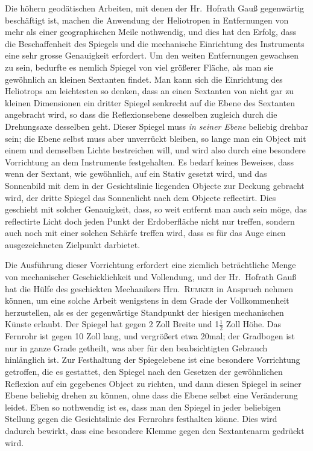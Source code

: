 \documentclass[12pt,a4paper]{article}
\theoremstyle{plain}
\theoremstyle{definition}
\theoremstyle{remark}
\begin{document}
Die h\"ohern geod\"atischen Arbeiten, mit denen der Hr.\ Hofrath Gau\ss{} gegenw\"artig besch\"aftigt ist, machen die Anwendung der Heliotropen in Entfernungen von mehr als einer geographischen Meile nothwendig, und dies hat den Erfolg, dass die Beschaffenheit des Spiegels und die mechanische Einrichtung des Instruments eine sehr grosse Genauigkeit erfordert. Um den weiten Entfernungen gewachsen zu sein, bedurfte es nemlich Spiegel von viel gr\"o\ss erer Fl\"ache, als man sie gew\"ohnlich an kleinen Sextanten findet. Man kann sich die Einrichtung des Heliotrops am leichtesten so denken, dass an einen Sextanten von nicht gar zu kleinen Dimensionen ein dritter Spiegel senkrecht auf die Ebene des Sextanten angebracht wird, so dass die Reflexionsebene desselben zugleich durch die Drehungsaxe desselben geht. Dieser Spiegel muss \textit{in seiner Ebene} beliebig drehbar sein; die Ebene selbst muss aber unverr\"uckt bleiben, so lange man ein Object mit einem und demselben Lichte bestreichen will, und wird also durch eine besondere Vorrichtung an dem Instrumente festgehalten. Es bedarf keines Beweises, dass wenn der Sextant, wie gew\"ohnlich, auf ein Stativ gesetzt wird, und das Sonnenbild mit dem in der Gesichtslinie liegenden Objecte zur Deckung gebracht wird, der dritte Spiegel das Sonnenlicht nach dem Objecte reflectirt. Dies geschieht mit solcher Genauigkeit, dass, so weit entfernt man auch sein m\"oge, das reflectirte Licht doch jeden Punkt der Erdoberfl\"ache nicht nur treffen, sondern auch noch mit einer solchen Sch\"arfe treffen wird, dass es f\"ur das Auge einen ausgezeichneten Zielpunkt darbietet.

Die Ausf\"uhrung dieser Vorrichtung erfordert eine ziemlich betr\"achtliche Menge von mechanischer Geschicklichkeit und Vollendung, und der Hr.\ Hofrath Gau\ss{} hat die H\"ulfe des geschickten Mechanikers Hrn.\ \textsc{Rumker} in Anspruch nehmen k\"onnen, um eine solche Arbeit wenigstens in dem Grade der Vollkommenheit herzustellen, als es der gegenw\"artige Standpunkt der hiesigen mechanischen K\"unste erlaubt. Der Spiegel hat gegen 2 Zoll Breite und 1$\tfrac12$ Zoll H\"ohe. Das Fernrohr ist gegen 10 Zoll lang, und vergr\"o\ss ert etwa 20mal; der Gradbogen ist nur in ganze Grade getheilt, was aber f\"ur den beabsichtigten Gebrauch hinl\"anglich ist. Zur Festhaltung der Spiegelebene ist eine besondere Vorrichtung getroffen, die es gestattet, den Spiegel nach den Gesetzen der gew\"ohnlichen Reflexion auf ein gegebenes Object zu richten, und dann diesen Spiegel in seiner Ebene beliebig drehen zu k\"onnen, ohne dass die Ebene selbst eine Ver\"anderung leidet. Eben so nothwendig ist es, dass man den Spiegel in jeder beliebigen Stellung gegen die Gesichtslinie des Fernrohrs festhalten k\"onne. Dies wird dadurch bewirkt, dass eine besondere Klemme gegen den Sextantenarm gedr\"uckt wird.
\end{document}

